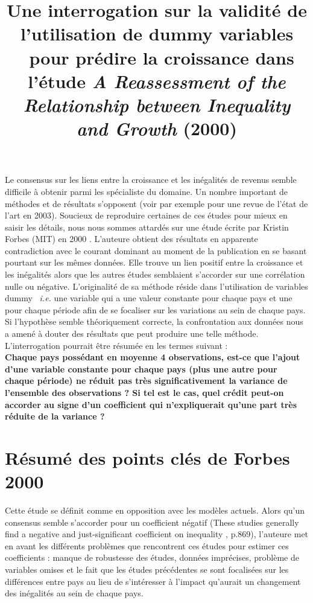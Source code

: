 \documentclass[11pt,a4paper]{article}
\begin{document}
\title{Une interrogation sur la validité de l'utilisation de \og dummy variables \fg~pour prédire la croissance dans l'étude \textit{A Reassessment of the Relationship between Inequality and Growth} (2000)}

\maketitle

Le consensus sur les liens entre la croissance et les inégalités de revenus semble difficile à obtenir parmi les spécialiste du domaine. Un nombre important de méthodes et de résultats s'opposent (voir par exemple \cite{banerjee} pour une revue de l'état de l'art en 2003). Soucieux de reproduire certaines de ces études pour mieux en saisir les détails, nous nous sommes attardés sur une étude écrite par Kristin Forbes (MIT) en 2000 \cite{forbes}. L'auteure obtient des résultats en apparente contradiction avec le courant dominant au moment de la publication en se basant pourtant sur les mêmes données. Elle trouve un lien positif entre la croissance et les inégalités alors que les autres études semblaient s'accorder sur une corrélation nulle ou négative. L'originalité de sa méthode réside dans l'utilisation de variables \og dummy \fg~\textit{i.e.} une variable qui a une valeur constante pour chaque pays et une pour chaque période afin de se focaliser sur les variations au sein de chaque pays. Si l'hypothèse semble théoriquement correcte, la confrontation aux données nous a amené à douter des résultats que peut produire une telle méthode. L'interrogation pourrait être résumée en les termes suivant : \\

\textbf{Chaque pays possédant en moyenne 4 observations, est-ce que l'ajout d'une variable constante pour chaque pays (plus une autre pour chaque période) ne réduit pas très significativement la variance de l'ensemble des observations ? Si tel est le cas, quel crédit peut-on accorder au signe d'un coefficient qui n'expliquerait qu'une part très réduite de la variance ?} \\


\section{Résumé des points clés de Forbes 2000 \cite{forbes}}

Cette étude se définit comme en opposition avec les modèles actuels. Alors qu'un consensus semble s'accorder pour un coefficient négatif (\og  These studies generally find a negative and just-significant coefficient on inequality \fg, p.869), l'auteure met en avant les différents problèmes que rencontrent ces études pour estimer ces coefficients : manque de robustesse des études, données imprécises, problème de variables omises et le fait que les études précédentes se sont focalisées sur les différences entre pays au lieu de s'intéresser à l'impact qu'aurait un changement des inégalités au sein de chaque pays. \\
\end{document}
